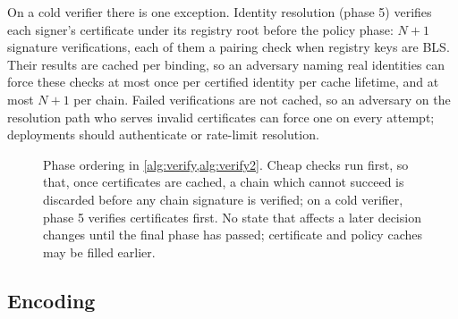 \documentclass[11pt,a4paper]{article}
\begin{document}
On a cold verifier there is one exception. Identity resolution (phase 5)
verifies each signer's certificate under its registry root before the
policy phase: $N + 1$ signature verifications, each of them a pairing
check when registry keys are BLS. Their results are cached per binding,
so an adversary naming real identities can force these checks at most
once per certified identity per cache lifetime, and at most $N + 1$ per
chain. Failed verifications are not cached, so an adversary on the
resolution path who serves invalid certificates can force one on every
attempt; deployments should authenticate or rate-limit resolution.

\begin{figure}[t]
\centering
{}
\caption{Phase ordering in \cref{alg:verify,alg:verify2}. Cheap checks
run first, so
that, once certificates are cached, a chain which cannot succeed is
discarded before any chain signature is verified; on a cold verifier,
phase 5 verifies certificates first. No state that affects a later decision changes
until the final phase has passed; certificate and policy caches may be
filled earlier.}
\label{fig:phases}
\end{figure}

\subsection{Encoding}
\label{sec:protocol-encoding}
\end{document}
